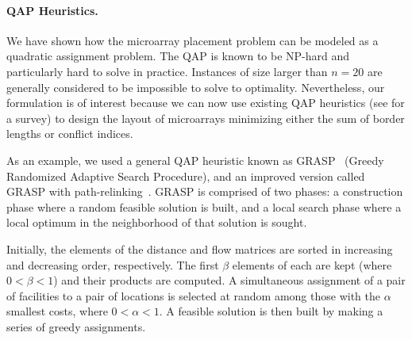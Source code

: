 \documentclass[english]{lni}
\newcommand{\ignore}[1]{}
\begin{document}
\paragraph{QAP Heuristics.}
We have shown how the microarray placement problem can be modeled as a
quadratic assignment problem.  The QAP is known to be NP-hard and
particularly hard to solve in practice.  Instances of size larger than
$n = 20$ are generally considered to be impossible to solve to
optimality. Nevertheless, our formulation is of interest because we
can now use existing QAP heuristics (see \cite{CELA98} for a survey)
to design the layout of microarrays minimizing either the sum of
border lengths or conflict indices.
\ignore{including approaches based on tabu search, simulated annealing and genetic algorithms}

As an example, we used a general QAP heuristic known as GRASP~\cite{LI94}
(Greedy Randomized Adaptive Search Procedure), and an improved version
called GRASP with path-relinking~\cite{OLIVEIRA04}.  GRASP is
comprised of two phases: a construction phase where a random feasible
solution is built, and a local search phase where a local optimum in
the neighborhood of that solution is sought.

Initially, the elements of the distance and flow matrices are sorted in
increasing and decreasing order, respectively. The first $\beta$ elements
of each are kept (where $0 < \beta < 1$) and their products are computed.
A simultaneous assignment of a pair of facilities to a pair of locations
is selected at random among those with the $\alpha$ smallest costs, where
$0 < \alpha < 1$. A feasible solution is then built by making a series of greedy
assignments.
\end{document}
